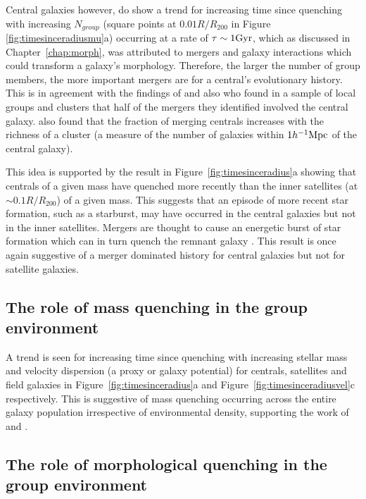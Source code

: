 Central galaxies however, do show a trend for increasing time since quenching with increasing $N_{group}$  (square points at $0.01 R/R_{200}$ in Figure \ref{fig:timesinceradiusmu}a) occurring at a rate of $\tau \sim 1 \rm{Gyr}$, which as discussed in Chapter~\ref{chap:morph}, was attributed to mergers and galaxy interactions which could transform a galaxy's morphology. Therefore, the larger the number of group members, the more important mergers are for a central's evolutionary history. This is in agreement with the findings of \citet{lin10, ellison10, lidman13} and also \citet{mcintosh08} who found in a sample of local groups and clusters that half of the mergers they identified involved the central galaxy. \cite{liu09} also found that the fraction of merging centrals increases with the richness of a cluster (a measure of the number of galaxies within $1h^{-1}\rm{Mpc}$ of the central galaxy).

This idea is supported by the result in Figure~\ref{fig:timesinceradius}a showing that centrals of a given mass have quenched more recently than the inner satellites (at $\sim0.1R/R_{200}$) of a given mass. This suggests that an episode of more recent star formation, such as a starburst, may have occurred in the central galaxies but not in the inner satellites. Mergers are thought to cause an energetic burst of star formation which can in turn quench the remnant galaxy \citep[][as discussed in Section \ref{rapid}]{hopkins05, treister12, pontzen16}. This result is once again suggestive of a merger dominated history for central galaxies but not for satellite galaxies.

\subsection{The role of mass quenching in the group environment}\label{sec:rolemassenv}

A trend is seen for increasing time since quenching with increasing stellar mass and velocity dispersion (a proxy or galaxy potential) for centrals, satellites and field galaxies in Figure~\ref{fig:timesinceradius}a and Figure~\ref{fig:timesinceradiusvel}c respectively. This is suggestive of mass quenching occurring across the entire galaxy population irrespective of environmental density, supporting the work of \citet{peng10, peng12, Gabor10} and \citet{darvish16}.

\subsection{The role of morphological quenching in the group environment}\label{sec:rolemorphenv}

